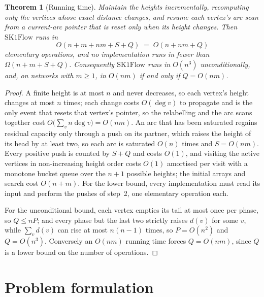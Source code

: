 \documentclass[10pt]{article}
\newtheorem{theorem}{Theorem}
\newcommand{\SKF}{\text{SK1Flow}}
\begin{document}
\begin{theorem}[Running time]\label{thm:time}
Maintain the heights incrementally, recomputing only the vertices whose exact
distance changes, and resume each vertex's arc scan from a current-arc pointer
that is reset only when its height changes. Then $\SKF$ runs in
\[
  O(n+m+nm+S+Q)\;=\;O(n+nm+Q)
\]
elementary operations, and no implementation runs in fewer than
$\Omega(n+m+S+Q)$. Consequently $\SKF$ runs in $O(n^{3})$ unconditionally, and,
on networks with $m\ge1$, in $O(nm)$ if and only if $Q=O(nm)$.
\end{theorem}

\begin{proof}
A finite height is at most $n$ and never decreases, so each vertex's height
changes at most $n$ times; each change costs $O(\deg v)$ to propagate and is the
only event that resets that vertex's pointer, so the relabelling and the arc
scans together cost $O\bigl(\sum_v n\deg v\bigr)=O(nm)$. An arc that has been
saturated regains residual capacity only through a push on its partner, which
raises the height of its head by at least two, so each arc is saturated $O(n)$
times and $S=O(nm)$. Every positive push is counted by $S+Q$ and costs $O(1)$,
and visiting the active vertices in non-increasing height order costs $O(1)$
amortised per visit with a monotone bucket queue over the $n+1$ possible
heights; the initial arrays and search cost $O(n+m)$. For the lower bound, every
implementation must read its input and perform the pushes of step~2, one
elementary operation each.

For the unconditional bound, each vertex empties its tail at most once per phase,
so $Q\le nP$; and every phase but the last two strictly raises $d(v)$ for some
$v$, while $\sum_v d(v)$ can rise at most $n(n-1)$ times, so $P=O(n^{2})$ and
$Q=O(n^{3})$. Conversely an $O(nm)$ running time forces $Q=O(nm)$, since $Q$ is
a lower bound on the number of operations.
\end{proof}

\section{Problem formulation}
\end{document}

